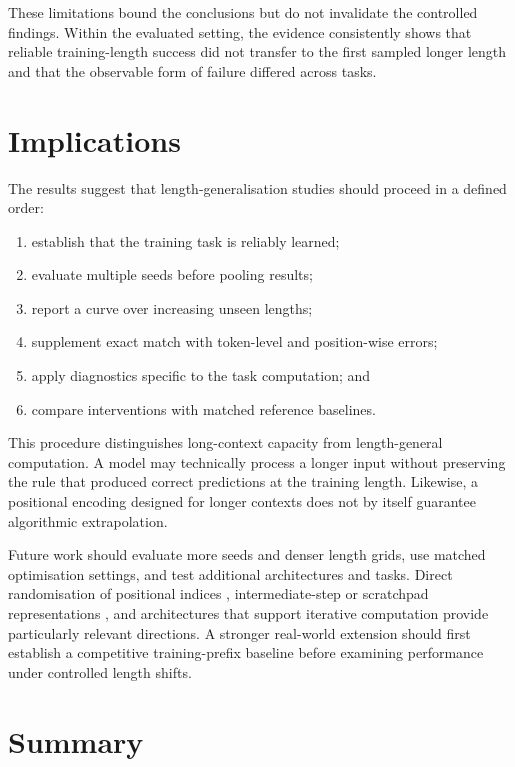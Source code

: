 \documentclass[
    author={Aanchala Ravindra Bhongade},
    supervisor={Dr. Fernando Moreno-Pino},
    degree={MSc},
    title={Length Generalisation in Transformer-Based Sequence Models: Failure Taxonomy and Mitigation Strategies},
    subtitle={},
    type={},
    year={2026}
]{dissertation}
\begin{document}
These limitations bound the conclusions but do not invalidate the controlled findings. Within the evaluated setting, the evidence consistently shows that reliable training-length success did not transfer to the first sampled longer length and that the observable form of failure differed across tasks.

\section{Implications}

The results suggest that length-generalisation studies should proceed in a defined order:

\begin{enumerate}
    \item establish that the training task is reliably learned;
    \item evaluate multiple seeds before pooling results;
    \item report a curve over increasing unseen lengths;
    \item supplement exact match with token-level and position-wise errors;
    \item apply diagnostics specific to the task computation; and
    \item compare interventions with matched reference baselines.
\end{enumerate}

This procedure distinguishes long-context capacity from length-general computation. A model may technically process a longer input without preserving the rule that produced correct predictions at the training length. Likewise, a positional encoding designed for longer contexts does not by itself guarantee algorithmic extrapolation.

Future work should evaluate more seeds and denser length grids, use matched optimisation settings, and test additional architectures and tasks. Direct randomisation of positional indices \cite{ruoss2023randomized}, intermediate-step or scratchpad representations \cite{anil2022exploring,kazemnejad2023impact}, and architectures that support iterative computation provide particularly relevant directions. A stronger real-world extension should first establish a competitive training-prefix baseline before examining performance under controlled length shifts.

\section{Summary}
\end{document}
